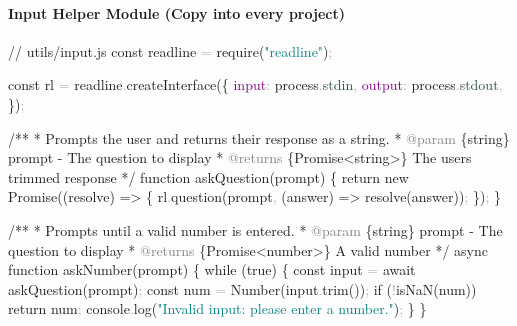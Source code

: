 \documentclass[
  justified,
  openright,
]{tufte-book}
\let\subsubsection\paragraph
\let\paragraph\paragraph
\newcommand{\AnnotationTok}[1]{\textcolor{Gray}{#1}}
\newcommand{\AttributeTok}[1]{\textcolor{DarkSlateGray}{#1}}
\newcommand{\BuiltInTok}[1]{#1}
\newcommand{\CommentTok}[1]{\textcolor{MidGray}{#1}}
\newcommand{\CommentVarTok}[1]{\textcolor{MidGray}{#1}}
\newcommand{\ControlFlowTok}[1]{\textcolor{BrandBlue}{#1}}
\newcommand{\DataTypeTok}[1]{\textcolor{Purple}{#1}}
\newcommand{\FunctionTok}[1]{\textcolor{BrandBlue}{#1}}
\newcommand{\KeywordTok}[1]{\textcolor{BrandBlue}{#1}}
\newcommand{\NormalTok}[1]{#1}
\newcommand{\OperatorTok}[1]{\textcolor{DarkGray}{#1}}
\newcommand{\PreprocessorTok}[1]{\textcolor{BrandAccent}{#1}}
\newcommand{\StringTok}[1]{\textcolor{Teal}{#1}}
\newenvironment{Shaded}{%
  \begin{snugshade}
}{%
  \end{snugshade}
}
\let\subsubsection\paragraph
\let\paragraph\paragraph
\begin{document}
\subsubsection{Input Helper Module (Copy into every
project)}\label{input-helper-module-copy-into-every-project}

\begin{Shaded}
\begin{Highlighting}[]
\CommentTok{// utils/input.js}
\KeywordTok{const}\NormalTok{ readline }\OperatorTok{=} \PreprocessorTok{require}\NormalTok{(}\StringTok{"readline"}\NormalTok{)}\OperatorTok{;}

\KeywordTok{const}\NormalTok{ rl }\OperatorTok{=}\NormalTok{ readline}\OperatorTok{.}\FunctionTok{createInterface}\NormalTok{(\{}
  \DataTypeTok{input}\OperatorTok{:} \BuiltInTok{process}\OperatorTok{.}\AttributeTok{stdin}\OperatorTok{,}
  \DataTypeTok{output}\OperatorTok{:} \BuiltInTok{process}\OperatorTok{.}\AttributeTok{stdout}\OperatorTok{,}
\NormalTok{\})}\OperatorTok{;}

\CommentTok{/**}
\CommentTok{ * Prompts the user and returns their response as a string.}
\CommentTok{ * }\AnnotationTok{@param}\CommentTok{ }\CommentVarTok{\{string\}}\CommentTok{ prompt {-} The question to display}
\CommentTok{ * }\AnnotationTok{@returns}\CommentTok{ \{Promise}\KeywordTok{\textless{}string\textgreater{}}\CommentTok{\} The user\textquotesingle{}s trimmed response}
\CommentTok{ */}
\KeywordTok{function} \FunctionTok{askQuestion}\NormalTok{(prompt) \{}
  \ControlFlowTok{return} \KeywordTok{new} \BuiltInTok{Promise}\NormalTok{((resolve) }\KeywordTok{=\textgreater{}}\NormalTok{ \{}
\NormalTok{    rl}\OperatorTok{.}\FunctionTok{question}\NormalTok{(prompt}\OperatorTok{,}\NormalTok{ (answer) }\KeywordTok{=\textgreater{}} \FunctionTok{resolve}\NormalTok{(answer))}\OperatorTok{;}
\NormalTok{  \})}\OperatorTok{;}
\NormalTok{\}}

\CommentTok{/**}
\CommentTok{ * Prompts until a valid number is entered.}
\CommentTok{ * }\AnnotationTok{@param}\CommentTok{ }\CommentVarTok{\{string\}}\CommentTok{ prompt {-} The question to display}
\CommentTok{ * }\AnnotationTok{@returns}\CommentTok{ \{Promise}\KeywordTok{\textless{}number\textgreater{}}\CommentTok{\} A valid number}
\CommentTok{ */}
\KeywordTok{async} \KeywordTok{function} \FunctionTok{askNumber}\NormalTok{(prompt) \{}
  \ControlFlowTok{while}\NormalTok{ (}\KeywordTok{true}\NormalTok{) \{}
    \KeywordTok{const}\NormalTok{ input }\OperatorTok{=} \ControlFlowTok{await} \FunctionTok{askQuestion}\NormalTok{(prompt)}\OperatorTok{;}
    \KeywordTok{const}\NormalTok{ num }\OperatorTok{=} \BuiltInTok{Number}\NormalTok{(input}\OperatorTok{.}\FunctionTok{trim}\NormalTok{())}\OperatorTok{;}
    \ControlFlowTok{if}\NormalTok{ (}\OperatorTok{!}\PreprocessorTok{isNaN}\NormalTok{(num)) }\ControlFlowTok{return}\NormalTok{ num}\OperatorTok{;}
    \BuiltInTok{console}\OperatorTok{.}\FunctionTok{log}\NormalTok{(}\StringTok{"Invalid input: please enter a number."}\NormalTok{)}\OperatorTok{;}
\NormalTok{  \}}
\NormalTok{\}}


\end{Highlighting}
\end{Shaded}
\end{document}
